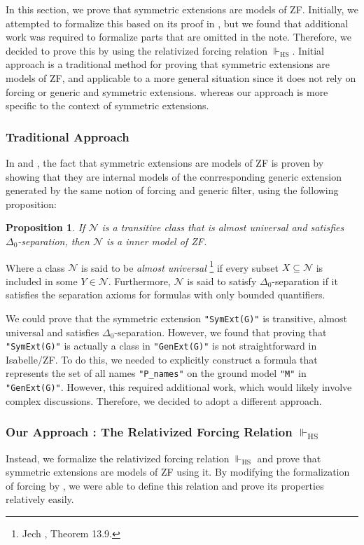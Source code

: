 \documentclass{report}
\newtheorem{prop}[thm]{Proposition}
\begin{document}
In this section, we prove that symmetric extensions are models of ZF.
Initially, we attempted to formalize this based on its proof in \cite[Theorem 10.10]{karagila},
but we found that additional work was required to formalize parts that are omitted in the note.
Therefore, we decided to prove this by using the relativized forcing relation $\Vdash_{\mathrm{HS}}$.
Initial approach is a traditional method for proving that symmetric extensions are models of ZF,
and applicable to a more general situation since 
it does not rely on forcing or generic and symmetric extensions.
whereas our approach is more specific to the context of symmetric extensions.

\subsubsection{Traditional Approach}

In \cite[Theorem 10.10]{karagila} and \cite{jech_set_theory},
the fact that symmetric extensions are models of ZF is proven by showing that 
they are internal models of the conrresponding generic extension
generated by the same notion of forcing and generic filter,
using the following proposition:

\begin{prop}
If $\mathcal{N}$ is a transitive class that is almost universal and satisfies $\Delta_0$-separation, 
then $\mathcal{N}$ is a inner model of ZF.
\end{prop}

Where a class $\mathcal{N}$ is said to be \emph{almost universal} 
\footnote{Jech \cite{jech_set_theory}, Theorem 13.9.} 
 if every subset $X \subseteq \mathcal{N}$ is included in some $Y \in \mathcal{N}$.
Furthermore, $\mathcal{N}$ is said to satisfy $\Delta_0$-separation if it satisfies the separation axioms for formulas with only bounded quantifiers.

We could prove that the symmetric extension \texttt{"SymExt(G)"} is transitive, almost universal and satisfies $\Delta_0$-separation.
However, 
we found that proving that \texttt{"SymExt(G)"} is actually a class in \texttt{"GenExt(G)"} is not straightforward in Isabelle/ZF.
To do this, we needed to explicitly construct a formula that represents the set of all names \texttt{"P\_names"} on the ground model \texttt{"M"} in \texttt{"GenExt(G)"}.
However, this required additional work, which would likely involve complex discussions.
Therefore, we decided to adopt a different approach.

\subsubsection{Our Approach : The Relativized Forcing Relation $\Vdash_{\mathrm{HS}}$}
Instead, we formalize the relativized forcing relation $\Vdash_{\mathrm{HS}}$ and prove that symmetric extensions are models of ZF using it.
By modifying the formalization of forcing by \cite{gunther_forcing}, 
we were able to define this relation and prove its properties relatively easily.
\end{document}
